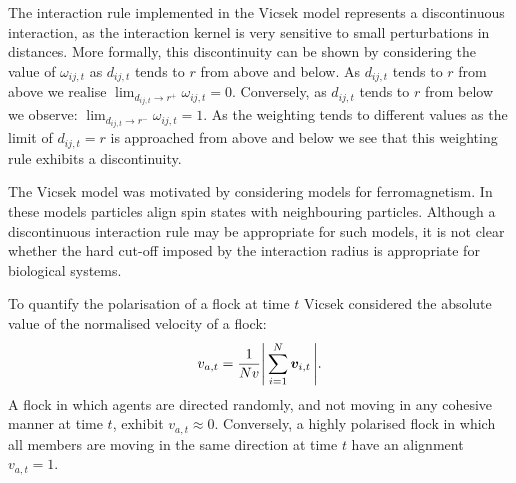 The interaction rule implemented in the Vicsek model represents a discontinuous
interaction, as the interaction kernel is very sensitive to small perturbations in
distances.  More formally, this discontinuity can be shown by considering the value of
$\omega_{ij, t}$ as $d_{ij,t}$ tends to $r$ from above and below. As $d_{ij,t}$ tends to
$r$ from above we realise $\lim_{d_{ij,t} \rightarrow r^+} \omega_{ij,t} = 0$.
Conversely, as $d_{ij,t}$ tends to $r$ from below we observe: $\lim_{d_{ij,t} \rightarrow
r^-} \omega_{ij,t} = 1$. As the weighting tends to different values as the limit of
$d_{ij,t}=r$ is approached from above and below we see that this weighting rule exhibits a
discontinuity.

The Vicsek model was motivated by considering models for ferromagnetism. In these models
particles align spin states with neighbouring particles. Although a discontinuous
interaction rule may be appropriate for such models, it is not clear whether the
hard cut-off imposed by the interaction radius is appropriate for biological systems.

To quantify the polarisation of a flock at time $t$ Vicsek considered the absolute value
of the normalised velocity of a flock:
\begin{equation}
    v_{a,t} = \frac{1}{Nv} \abs{\,\sum_{i=1}^N \bm{v}_{i,t}\,}.
\end{equation}
A flock in which
agents are directed randomly, and not moving in any cohesive manner at time $t$, exhibit
$v_{a,t}\approx0$. Conversely, a highly polarised flock in which all members are moving in
the same direction at time $t$ have an alignment $v_{a,t}=1$.

